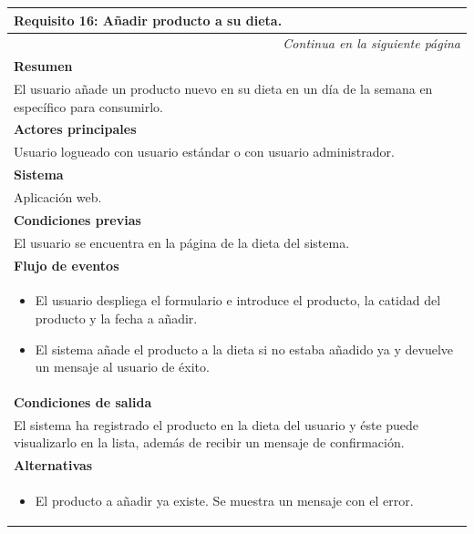 \begin{longtable}{|p{}|}
\hline
 \rowcolor[gray]{.5}
 \color{white}\textbf{Requisito 16: Añadir producto a su dieta.} \\
\hline
\endfirsthead
\endhead
\hline \multicolumn{1}{r}{\textit{Continua en la siguiente página}} \\
\endfoot
\endlastfoot
    \rowcolor[gray]{.9}
     \textbf{Resumen} \\
     \hline
     El usuario añade un producto nuevo en su dieta en un día de la semana en específico para consumirlo. \\
     \hline
     \rowcolor[gray]{.9}
     \textbf{Actores principales} \\
     \hline
     Usuario logueado con usuario estándar o con usuario administrador. \\
     \hline
     \rowcolor[gray]{.9}
     \textbf{Sistema} \\
     \hline
     Aplicación web. \\
     \hline
     \rowcolor[gray]{.9}
     \textbf{Condiciones previas} \\
     \hline
     El usuario se encuentra en la página de la dieta del sistema. \\
     \hline
     \rowcolor[gray]{.9}
     \textbf{Flujo de eventos}  \\
     \hline
      \begin{itemize}
         \item El usuario despliega el formulario e introduce el producto, la catidad del producto y la fecha a añadir.
         \item El sistema añade el producto a la dieta si no estaba añadido ya y devuelve un mensaje al usuario de éxito.
     \end{itemize} \\
     \hline
     \rowcolor[gray]{.9}
     \textbf{Condiciones de salida} \\
     \hline
     El sistema ha registrado el producto en la dieta del usuario y éste puede visualizarlo en la lista, además de recibir un mensaje de confirmación. \\
     \hline
     \rowcolor[gray]{.9}
     \textbf{Alternativas}  \\
     \hline
      \begin{itemize}
         \item El producto a añadir ya existe. Se muestra un mensaje con el error.
     \end{itemize} \\
     \hline
\end{longtable}

